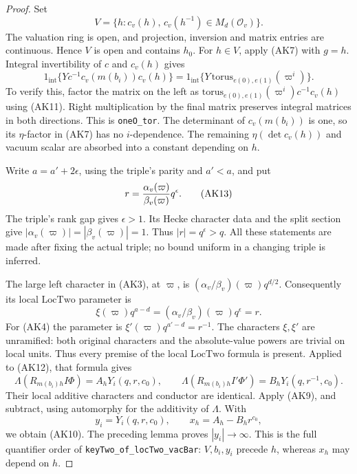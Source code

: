 \begin{proof}
Set
\[
 V=\{h:c_v(h),\,c_v(h^{-1})\in M_d(\mathcal O_v)\}.
\]
The valuation ring is open, and projection, inversion and matrix
entries are continuous. Hence \(V\) is open and contains \(h_0\).
For \(h\in V\), apply (AK7) with \(g=h\).
Integral invertibility of \(c\) and \(c_v(h)\) gives
\[
 1_{\mathrm{int}}\{Yc^{-1}c_v(m(b_i))c_v(h)\}
       =1_{\mathrm{int}}\{
                    Y\,\mathrm{torus}_{e(0),e(1)}(\varpi^i)\}.
 \tag{AK12}\label{eq:sr-source-key-two-vacuum-torus}
\]
To verify this, factor the matrix on the left as
\(\mathrm{torus}_{e(0),e(1)}(\varpi^i)c^{-1}c_v(h)\)
using (AK11).
Right multiplication by the final matrix preserves integral matrices
in both directions. This is \texttt{oneO\_tor}.
The determinant of \(c_v(m(b_i))\) is one, so its \(\eta\)-factor
in (AK7) has no \(i\)-dependence.
The remaining \(\eta(\det c_v(h))\) and vacuum scalar are absorbed
into a constant depending on \(h\).

Write \(a=a'+2\epsilon\), using the triple's parity and \(a'<a\), and
put
\[
 r={\alpha_v(\varpi)\over\beta_v(\varpi)}q^\epsilon.
 \tag{AK13}\label{eq:sr-source-key-two-r}
\]
The triple's rank gap gives \(\epsilon>1\).
Its Hecke character data and the split section give
\(|\alpha_v(\varpi)|=|\beta_v(\varpi)|=1\).
Thus \(|r|=q^\epsilon>q\).
All these statements are made after fixing the actual triple;
no bound uniform in a changing triple is inferred.

The large left character in (AK3), at \(\varpi\), is
\((\alpha_v/\beta_v)(\varpi)q^{d/2}\).
Consequently its local \(\mathrm{LocTwo}\) parameter is
\[
                    \xi(\varpi)q^{a-d}
                       =(\alpha_v/\beta_v)(\varpi)q^\epsilon=r.
\]
For (AK4) the parameter is
\(\xi'(\varpi)q^{a'-d}=r^{-1}\).
The characters \(\xi,\xi'\) are unramified: both original
characters and the absolute-value powers are trivial on local units.
Thus every premise of the local \(\mathrm{LocTwo}\) formula is present.
Applied to (AK12), that formula gives
\[
 \Lambda(R_{m(b_i)h}I\Phi)=A_hY_i(q,r,c_0),\qquad
 \Lambda(R_{m(b_i)h}I'\Phi')=B_hY_i(q,r^{-1},c_0).
\]
Their local additive characters and conductor are identical.
Apply (AK9), and subtract, using automorphy for the additivity of
\(\Lambda\).
With
\[
             y_i=Y_i(q,r,c_0),\qquad
                         x_h=A_h-B_hr^{c_0},
\]
we obtain (AK10).
The preceding lemma proves \(|y_i|\to\infty\).
This is the full quantifier order of
\texttt{keyTwo\_of\_locTwo\_vacBar}: \(V,b_i,y_i\) precede \(h\),
whereas \(x_h\) may depend on \(h\).
\end{proof}

